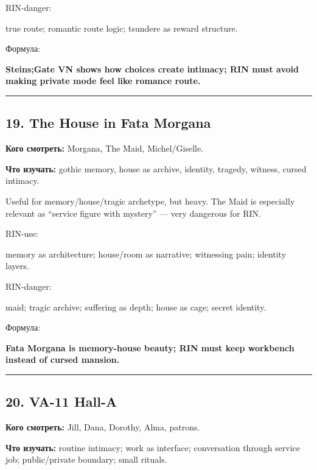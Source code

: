 RIN-danger:

true route; romantic route logic; tsundere as reward structure.

Формула:

\textbf{Steins;Gate VN shows how choices create intimacy; RIN must avoid
making private mode feel like romance route.}

\begin{center}\rule{0.5\linewidth}{0.5pt}\end{center}

\subsection*{19. The House in Fata Morgana}

\textbf{Кого смотреть:} Morgana, The Maid, Michel/\hspace{0pt}Giselle.

\textbf{Что изучать:} gothic memory, house as archive, identity,
tragedy, witness, cursed intimacy.

Useful for memory/\hspace{0pt}house/\hspace{0pt}tragic archetype, but heavy. The Maid is
especially relevant as ``service figure with mystery'' --- very
dangerous for RIN.

RIN-use:

memory as architecture; house/\hspace{0pt}room as narrative; witnessing pain;
identity layers.

RIN-danger:

maid; tragic archive; suffering as depth; house as cage; secret
identity.

Формула:

\textbf{Fata Morgana is memory-house beauty; RIN must keep workbench
instead of cursed mansion.}

\begin{center}\rule{0.5\linewidth}{0.5pt}\end{center}

\subsection*{20. VA-11 Hall-A}

\textbf{Кого смотреть:} Jill, Dana, Dorothy, Alma, patrons.

\textbf{Что изучать:} routine intimacy; work as interface; conversation
through service job; public/\hspace{0pt}private boundary; small rituals.

